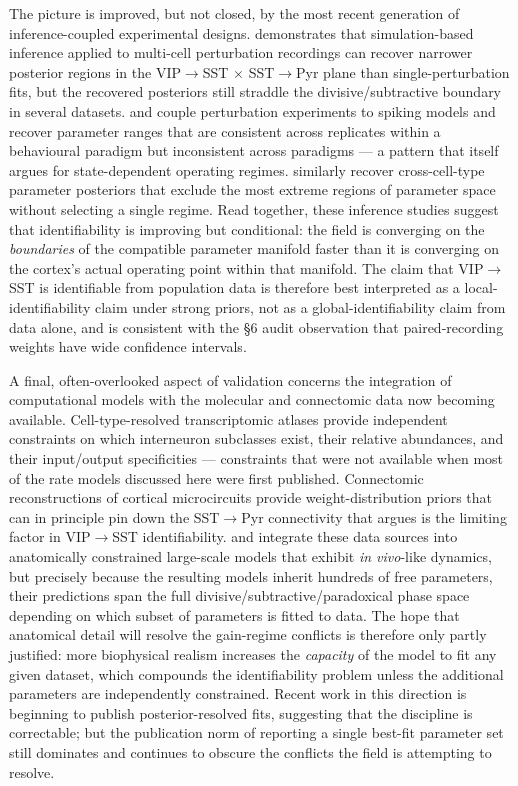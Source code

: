 \documentclass[11pt]{article}
\let\origrightarrow\rightarrow
\def\rightarrow{\ensuremath{\origrightarrow}}
\begin{document}
The picture is improved, but not closed, by the most recent generation of inference-coupled experimental designs. \citet{Moreni2025a} demonstrates that simulation-based inference applied to multi-cell perturbation recordings can recover narrower posterior regions in the VIP\rightarrow SST $\times$ SST\rightarrow Pyr plane than single-perturbation fits, but the recovered posteriors still straddle the divisive/subtractive boundary in several datasets. \citet{Jiang2024b} and \citet{Huang2025a} couple perturbation experiments to spiking models and recover parameter ranges that are consistent across replicates within a behavioural paradigm but inconsistent across paradigms --- a pattern that itself argues for state-dependent operating regimes. \citet{Chou2021} similarly recover cross-cell-type parameter posteriors that exclude the most extreme regions of parameter space without selecting a single regime. Read together, these inference studies suggest that identifiability is improving but conditional: the field is converging on the \textit{boundaries} of the compatible parameter manifold faster than it is converging on the cortex's actual operating point within that manifold. The \citep{Litwinkumar2016} claim that VIP\rightarrow SST is identifiable from population data is therefore best interpreted as a local-identifiability claim under strong priors, not as a global-identifiability claim from data alone, and is consistent with the §6 audit observation that paired-recording weights have wide confidence intervals.

A final, often-overlooked aspect of validation concerns the integration of computational models with the molecular and connectomic data now becoming available. Cell-type-resolved transcriptomic atlases \citep{Yao2023, Rudy2011} provide independent constraints on which interneuron subclasses exist, their relative abundances, and their input/output specificities --- constraints that were not available when most of the rate models discussed here were first published. Connectomic reconstructions of cortical microcircuits \citep{Hua2022, Talapka2025} provide weight-distribution priors that can in principle pin down the SST\rightarrow Pyr connectivity that \citep{Litwinkumar2016} argues is the limiting factor in VIP\rightarrow SST identifiability.  and \citet{Isbister2026} integrate these data sources into anatomically constrained large-scale models that exhibit \textit{in vivo}-like dynamics, but precisely because the resulting models inherit hundreds of free parameters, their predictions span the full divisive/subtractive/paradoxical phase space depending on which subset of parameters is fitted to data. The hope that anatomical detail will resolve the gain-regime conflicts is therefore only partly justified: more biophysical realism increases the \textit{capacity} of the model to fit any given dataset, which compounds the identifiability problem unless the additional parameters are independently constrained. Recent work in this direction \citep{Sancheztodo2026, Moreni2025a} is beginning to publish posterior-resolved fits, suggesting that the discipline is correctable; but the publication norm of reporting a single best-fit parameter set still dominates and continues to obscure the conflicts the field is attempting to resolve.
\end{document}
